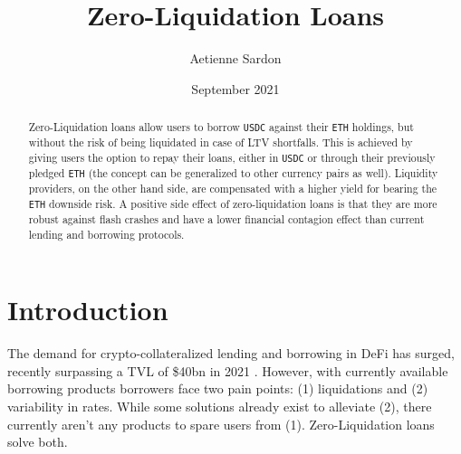 \documentclass[a4paper]{article}
\title{Zero-Liquidation Loans}
\author{Aetienne Sardon}
\date{September 2021}
\begin{document}
\maketitle




\begin{abstract}
Zero-Liquidation loans allow users to borrow \verb|USDC| against their \verb|ETH| holdings, but without the risk of being liquidated in case of LTV shortfalls. This is achieved by giving users the option to repay their loans, either in \verb|USDC| or through their previously pledged \verb|ETH| (the concept can be generalized to other currency pairs as well). Liquidity providers, on the other hand side, are compensated with a higher yield for bearing the \verb|ETH| downside risk. A positive side effect of zero-liquidation loans is that they are more robust against flash crashes and have a lower financial contagion effect than current lending and borrowing protocols. %
\end{abstract}

\section{Introduction}
The demand for crypto-collateralized lending and borrowing in DeFi has surged, recently surpassing a TVL of \$40bn in 2021 \cite{aave} \cite{compound}. However, with currently available borrowing products borrowers face two pain points: (1) liquidations and (2) variability in rates. While some solutions already exist to alleviate (2), there currently aren't any products to spare users from (1). Zero-Liquidation loans solve both.\\
\end{document}
